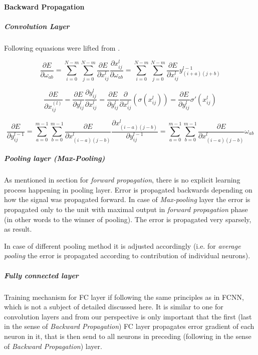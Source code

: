 \documentclass[11pt]{article}
\begin{document}
\paragraph{Backward Propagation}
\label{sec:orgaf98956}
\subparagraph{Convolution Layer}
\label{sec:orgc204475}
Following equasions were lifted from \cite{book--goodfellow--2016}.

\begin{equation}
\frac{\partial E} {\partial \omega_{ab}}
=\sum_{i=0}^{N-m} \sum_{j=0}^{N-m} \frac{\partial E}{\partial x_{ij}^{l}} \frac{\partial x_{ij}^{l}} {\partial \omega_{ab}}
=\sum_{i=0}^{N-m} \sum_{j=0}^{N-m} \frac{\partial E}{\partial x_{ij}^{l}} y_{(i+a)(j+b)}^{l-1}
\end{equation}

\begin{equation}
\frac{\partial E} {\partial x_{ij}^{(l)}}
=\frac{\partial E} {\partial y_{ij}^{l}} \frac{\partial y_{ij}^{l}} {\partial x_{ij}^{l}}
=\frac{\partial E} {\partial y_{ij}^{l}} \frac{\partial} {\partial x_{ij}^{l}} \left( \sigma\left(x_{ij}^{l}\right) \right)
=\frac{\partial E} {\partial y_{ij}^{l}} \sigma' \left( x_{ij}^{l} \right)
\end{equation}

\begin{equation}
\frac{\partial E} {\partial y_{ij}^{l-1}}
=\sum_{a=0}^{m-1} \sum_{b=0}^{m-1} \frac{\partial E} {\partial x_{(i-a)(j-b)}^{l}} \frac{\partial x_{(i-a)(j-b)}^{l}} {\partial  y_{ij}^{l-1}}
=\sum_{a=0}^{m-1} \sum_{b=0}^{m-1} \frac{\partial E} {\partial x_{(i-a)(j-b)}^{l}} \omega_{ab}
\end{equation}

\subparagraph{Pooling layer (Max-Pooling)}
\label{sec:orgaba6d1b}
As mentioned in section for \emph{forward propagation}, there is no explicit learning process happening in pooling layer. Error is propagated backwards depending on how the signal was propagated forward. In case of \emph{Max-pooling} layer the error is propagated only to the unit with maximal output in \emph{forward propagation} phase (in other words to the winner of pooling). The error is propagated very sparsely, as result.

In case of different pooling method it is adjusted accordingly (i.e. for \emph{average pooling} the error is propagated according to contribution of individual neurons).

\subparagraph{Fully connected layer}
\label{sec:org0cbd9c2}
Training mechanism for FC layer if following the same principles as in FCNN, which is not a subject of detailed discussed here. It is similar to one for convolution layers and from our perspective is only important that the first (last in the sense of \emph{Backward Propagation}) FC layer propagates error gradient of each neuron in it, that is then send to all neurons in preceding (following in the sense of \emph{Backward Propagation}) layer.
\end{document}
